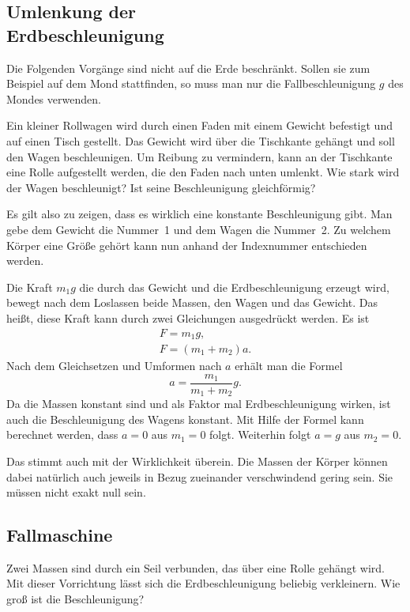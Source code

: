 \documentclass[a4paper,10pt,fleqn,twocolumn,twoside]{article}
\begin{document}
\subsection[Umlenkung der Erdbeschleunigung]
{Umlenkung der\\ Erdbeschleunigung}

Die Folgenden Vorgänge sind nicht auf die Erde beschränkt. Sollen
sie zum Beispiel auf dem Mond stattfinden, so muss man nur die
Fallbeschleunigung $g$ des Mondes verwenden.

Ein kleiner Rollwagen wird durch einen Faden mit einem Gewicht
befestigt und auf einen Tisch gestellt. Das Gewicht wird über die
Tischkante gehängt und soll den Wagen beschleunigen. Um Reibung zu
vermindern, kann an der Tischkante eine Rolle aufgestellt werden, die
den Faden nach unten umlenkt. Wie stark wird der Wagen beschleunigt?
Ist seine Beschleunigung gleichförmig?

Es gilt also zu zeigen, dass es wirklich eine konstante Beschleunigung
gibt. Man gebe dem Gewicht die Nummer~1 und dem Wagen die Nummer~2.
Zu welchem Körper eine Größe gehört kann nun anhand der Indexnummer
entschieden werden.

Die Kraft ${m_1}g$ die durch das Gewicht und die Erdbeschleunigung
erzeugt wird, bewegt nach dem Loslassen beide Massen, den Wagen und das
Gewicht. Das heißt, diese Kraft kann durch zwei Gleichungen ausgedrückt
werden. Es ist
\begin{gather*}
F = {m_1}g,\\
F = (m_1+m_2)a.
\end{gather*}
Nach dem Gleichsetzen und Umformen nach $a$ erhält man die Formel
\[a = \frac{m_1}{m_1+m_2} g.\]
Da die Massen konstant sind und als Faktor mal Erdbeschleunigung
wirken, ist auch die Beschleunigung des Wagens konstant. Mit Hilfe
der Formel kann berechnet werden, dass $a=0$ aus $m_1=0$ folgt.
Weiterhin folgt $a=g$ aus $m_2=0$.

Das stimmt auch mit der Wirklichkeit überein. Die Massen der Körper
können dabei natürlich auch jeweils in Bezug zueinander verschwindend
gering sein. Sie müssen nicht exakt null sein.

\subsection{Fallmaschine}

Zwei Massen sind durch ein Seil verbunden, das über eine Rolle gehängt
wird. Mit dieser Vorrichtung lässt sich die Erdbeschleunigung beliebig
verkleinern. Wie groß ist die Beschleunigung?
\end{document}
